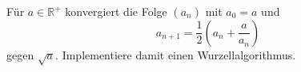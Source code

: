 \begin{aufg}
Für $a \in \mathbb{R}^+$ konvergiert die Folge $(a_n)$ mit $a_0 = a$ und
\[ a_{n+1} = \frac{1}{2}\left(a_n + \frac{a}{a_n}\right) \]
gegen $\sqrt{a}$. Implementiere damit einen Wurzellalgorithmus.
\end{aufg}